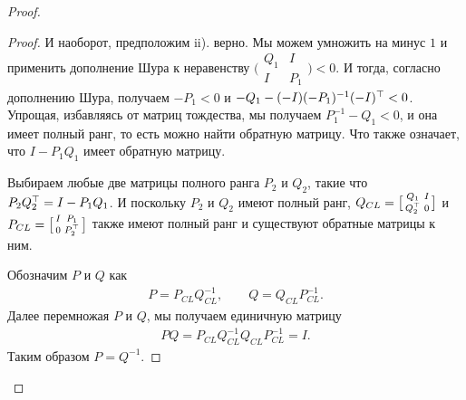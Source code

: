 \begin{proof}
\begin{proof}
		И наоборот, предположим ii). верно. Мы можем умножить на минус $1$ и применить дополнение Шура к неравенству 
		$\bigl( \begin{smallmatrix} 
			{Q}_{1} & I \\ 
			I & {P}_{1}\end{smallmatrix} \bigr) <0$. 
		И тогда, согласно дополнению Шура, получаем $-{P}_{1}<0$ и $-{Q}_{1}-(-{I})(-{P}_{1})^{-1}(-{I})^\top<0$. Упрощая, избавляясь от матриц тождества, мы получаем ${P}_{1}^{-1}-{Q}_{1}<0$, и она имеет полный ранг, то есть можно найти обратную матрицу. Что также означает, что ${I}-{P}_{1}{Q}_{1}$ имеет обратную матрицу.
		
		Выбираем любые две матрицы полного ранга ${P}_{2}$ и ${Q}_{2}$, такие что ${P}_{2}{Q}_{2}^\top={I}-{P}_{1}{Q}_{1}$. И поскольку ${P}_2$ и ${Q}_2$ имеют полный ранг, ${Q}_{CL}=\bigl[\begin{smallmatrix}  
			{Q}_{1} & {I}\\
			{Q}_{2}^\top & 0
		\end{smallmatrix} \bigr]$ и 
		${P}_{CL}=\bigl[ \begin{smallmatrix}
			{I} & {P}_{1} \\
			0 & {P}_{2}^\top
		\end{smallmatrix} \bigr]$ также имеют полный ранг и существуют обратные матрицы к ним.
		
		Обозначим ${P}$ и ${Q}$ как 
		\begin{align*}
			{P} = {P}_{CL}{Q}_{CL}^{-1}, \qquad {Q} ={Q}_{CL}{P}_{CL}^{-1}.
		\end{align*} 
		Далее перемножая ${P}$ и ${Q}$, мы получаем единичную матрицу
		\begin{align*}
			{P}{Q}={P}_{CL}{Q}_{CL}^{-1}{Q}_{CL}{P}_{CL}^{-1}={I}.
		\end{align*}
		Таким образом ${P}={Q}^{-1}$.
		

\end{proof}
\end{proof}
